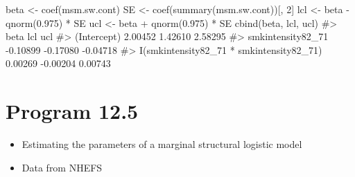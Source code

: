 \documentclass[
  10pt,
  a4paper,
]{book}
\newenvironment{Shaded}{\begin{snugshade}}{\end{snugshade}}
\newcommand{\CommentTok}[1]{\textcolor[rgb]{0.37,0.37,0.37}{#1}}
\newcommand{\DecValTok}[1]{\textcolor[rgb]{0.68,0.00,0.00}{#1}}
\newcommand{\FloatTok}[1]{\textcolor[rgb]{0.68,0.00,0.00}{#1}}
\newcommand{\FunctionTok}[1]{\textcolor[rgb]{0.28,0.35,0.67}{#1}}
\newcommand{\NormalTok}[1]{\textcolor[rgb]{0.00,0.46,0.62}{#1}}
\newcommand{\OtherTok}[1]{\textcolor[rgb]{0.00,0.46,0.62}{#1}}
\newcommand{\SpecialCharTok}[1]{\textcolor[rgb]{0.37,0.37,0.37}{#1}}
\providecommand{\tightlist}{%
  \setlength{\itemsep}{0pt}\setlength{\parskip}{0pt}}
\begin{document}
\begin{Shaded}
\begin{Highlighting}[]
\NormalTok{beta }\OtherTok{\textless{}{-}} \FunctionTok{coef}\NormalTok{(msm.sw.cont)}
\NormalTok{SE }\OtherTok{\textless{}{-}} \FunctionTok{coef}\NormalTok{(}\FunctionTok{summary}\NormalTok{(msm.sw.cont))[, }\DecValTok{2}\NormalTok{]}
\NormalTok{lcl }\OtherTok{\textless{}{-}}\NormalTok{ beta }\SpecialCharTok{{-}} \FunctionTok{qnorm}\NormalTok{(}\FloatTok{0.975}\NormalTok{) }\SpecialCharTok{*}\NormalTok{ SE}
\NormalTok{ucl }\OtherTok{\textless{}{-}}\NormalTok{ beta }\SpecialCharTok{+} \FunctionTok{qnorm}\NormalTok{(}\FloatTok{0.975}\NormalTok{) }\SpecialCharTok{*}\NormalTok{ SE}
\FunctionTok{cbind}\NormalTok{(beta, lcl, ucl)}
\CommentTok{\#\textgreater{}                                              beta      lcl      ucl}
\CommentTok{\#\textgreater{} (Intercept)                               2.00452  1.42610  2.58295}
\CommentTok{\#\textgreater{} smkintensity82\_71                        {-}0.10899 {-}0.17080 {-}0.04718}
\CommentTok{\#\textgreater{} I(smkintensity82\_71 * smkintensity82\_71)  0.00269 {-}0.00204  0.00743}
\end{Highlighting}
\end{Shaded}

\section{Program 12.5}\label{program-12.5}

\begin{itemize}
\tightlist
\item
  Estimating the parameters of a marginal structural logistic model
\item
  Data from NHEFS
\end{itemize}
\end{document}
